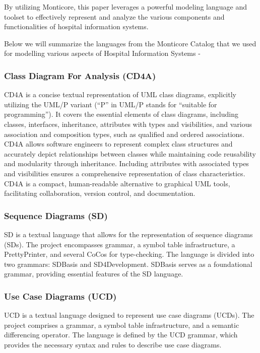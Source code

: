 By utilizing Monticore, this paper leverages a powerful modeling language and toolset to effectively represent and analyze the various components and functionalities of hospital information systems.

Below we will summarize the languages from the Monticore Catalog that we used for modelling various aspects of Hospital Information Systems - 

\subsubsection{Class Diagram For Analysis (CD4A)}
CD4A is a concise textual representation of UML class diagrams, explicitly utilizing the UML/P variant (“P” in UML/P stands for “suitable for programming”). It covers the essential elements of class diagrams, including classes, interfaces, inheritance, attributes with types and visibilities, and various association and composition types, such as qualified and ordered associations. CD4A allows software engineers to represent complex class structures and accurately depict relationships between classes while maintaining code reusability and modularity through inheritance. Including attributes with associated types and visibilities ensures a comprehensive representation of class characteristics. CD4A is a compact, human-readable alternative to graphical UML tools, facilitating collaboration, version control, and documentation.\cite{MontiCore}
 
 
\subsubsection{Sequence Diagrams (SD)}
SD is a textual language that allows for the representation of sequence diagrams (SDs). The project encompasses grammar, a symbol table infrastructure, a PrettyPrinter, and several CoCos for type-checking. The language is divided into two grammars: SDBasis and SD4Development. SDBasis serves as a foundational grammar, providing essential features of the SD language.\cite{MontiCore}


\subsubsection{Use Case Diagrams (UCD)}

UCD is a textual language designed to represent use case diagrams (UCDs). The project comprises a grammar, a symbol table infrastructure, and a semantic differencing operator. The language is defined by the UCD grammar, which provides the necessary syntax and rules to describe use case diagrams.

